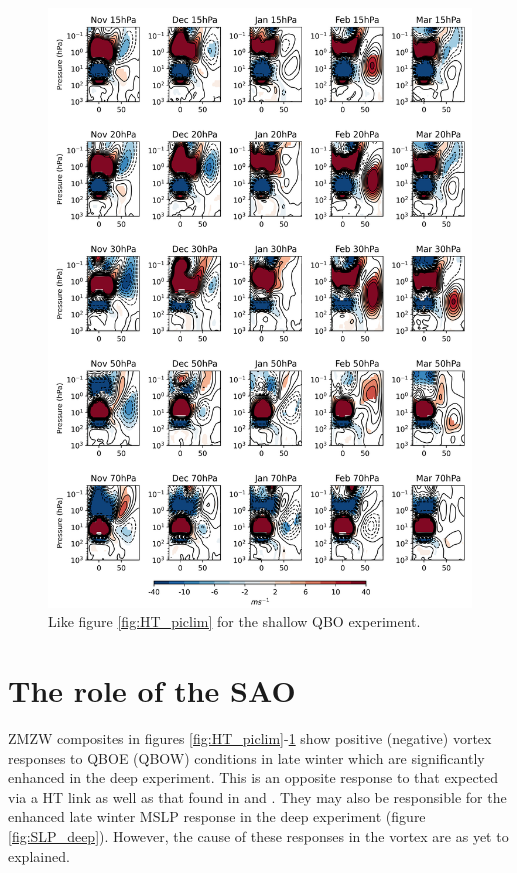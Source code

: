 \begin{figure}[h!]
\begin{center}
\noindent\includegraphics[width = 0.8\linewidth]{Figures/Figures-deepQBO/ZMZW_composites_by_month_QBO_phases_U_s_MarQBO_vs_Mar_70hPa_5thresh.png}
\caption[ZMZW composites under different QBO phases in the shallow QBO simulation]{Like figure \ref{fig:HT_piclim} for the shallow QBO experiment.}
\label{fig:HT_shallow}
\end{center}
\end{figure}
\newpage 

\section{The role of the SAO}
\label{sec:role_SAO}

ZMZW composites in figures \ref{fig:HT_piclim}-\ref{fig:HT_shallow} show positive (negative) vortex responses to QBOE (QBOW) conditions in late winter which are significantly enhanced in the deep experiment. This is an opposite response to that expected via a HT link as well as that found in \cite{andrewsObserved2019d} and \cite{graySurface2018b}. They may also be responsible for the enhanced late winter MSLP response in the deep experiment (figure \ref{fig:SLP_deep}). However, the cause of these responses in the vortex are as yet to explained. 

